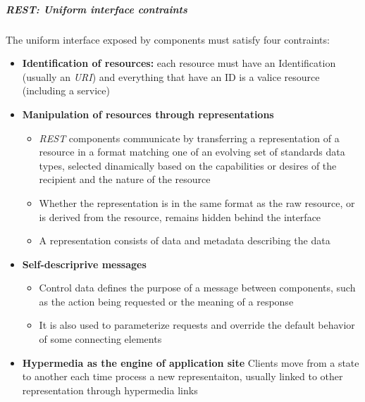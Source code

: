     \subparagraph{REST: Uniform interface contraints}
    The uniform interface exposed by components must satisfy four contraints:
    \begin{itemize}
        \item \textbf{Identification of resources:} each resource must have an Identification
            (usually an \textit{URI}) and everything that have an ID is a valice resource 
            (including a service)
        \item \textbf{Manipulation of resources through representations}
        \begin{itemize}
            \item \textit{REST} components communicate by transferring a representation of a
                resource in a format matching one of an evolving set of standards data types,
                selected dinamically based on the capabilities or desires of the recipient and
                the nature of the resource
            \item Whether the representation is in the same format as the raw
                resource, or is derived from the resource, remains hidden behind the interface
            \item A representation consists of data and metadata describing the data
        \end{itemize}
        \item \textbf{Self-descriprive messages}
        \begin{itemize}
            \item Control data defines the purpose of a message between components, such as the 
                action being requested or the meaning of a response
            \item It is also used to parameterize requests and override the default behavior of
                some connecting elements
        \end{itemize}
        \item \textbf{Hypermedia as the engine of application site}
            Clients move from a state to another each time process a new representaiton, usually
            linked to other representation through hypermedia links
    \end{itemize}

